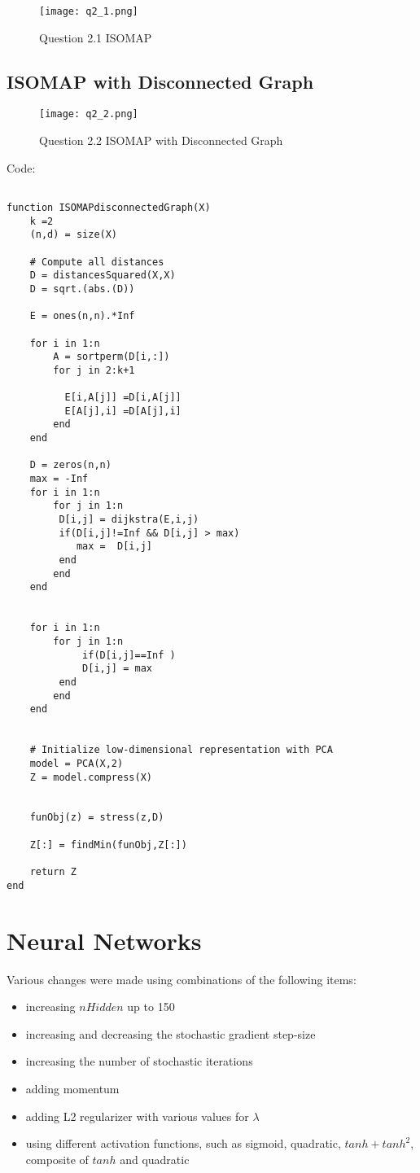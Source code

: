 \documentclass{article}
\def\items#1{\begin{itemize}#1\end{itemize}}
\begin{document}
\begin{figure}[h!]
    \texttt{[image: q2\_1.png]}
    \caption{Question 2.1 ISOMAP}
    \label{fig:q2_1}
\end{figure}


\subsection{ISOMAP with Disconnected Graph}

\begin{figure}[h!]
    \texttt{[image: q2\_2.png]}
    \caption{Question 2.2 ISOMAP with Disconnected Graph}
    \label{fig:q2_2}
\end{figure}

Code:
\begin{verbatim}

function ISOMAPdisconnectedGraph(X)
    k =2
    (n,d) = size(X)

    # Compute all distances
    D = distancesSquared(X,X)
    D = sqrt.(abs.(D))

    E = ones(n,n).*Inf

    for i in 1:n
        A = sortperm(D[i,:])
        for j in 2:k+1
          
          E[i,A[j]] =D[i,A[j]]
          E[A[j],i] =D[A[j],i]     
        end 
    end

    D = zeros(n,n)
    max = -Inf
    for i in 1:n
        for j in 1:n
         D[i,j] = dijkstra(E,i,j)
         if(D[i,j]!=Inf && D[i,j] > max)
            max =  D[i,j]
         end
        end
    end


    for i in 1:n
        for j in 1:n
             if(D[i,j]==Inf )
             D[i,j] = max
         end
        end
    end


    # Initialize low-dimensional representation with PCA
    model = PCA(X,2)
    Z = model.compress(X)
    

    funObj(z) = stress(z,D)

    Z[:] = findMin(funObj,Z[:])

    return Z
end

\end{verbatim}

\section{Neural Networks}

Various changes were made using combinations of the following items:
\items{
\item increasing $nHidden$ up to 150
\item increasing and decreasing the stochastic gradient step-size
\item increasing the number of stochastic iterations
\item adding momentum
\item adding L2 regularizer with various values for $\lambda$
\item using different activation functions, such as sigmoid, quadratic, $tanh + tanh^2$, composite of $tanh$ and quadratic
}
\end{document}
